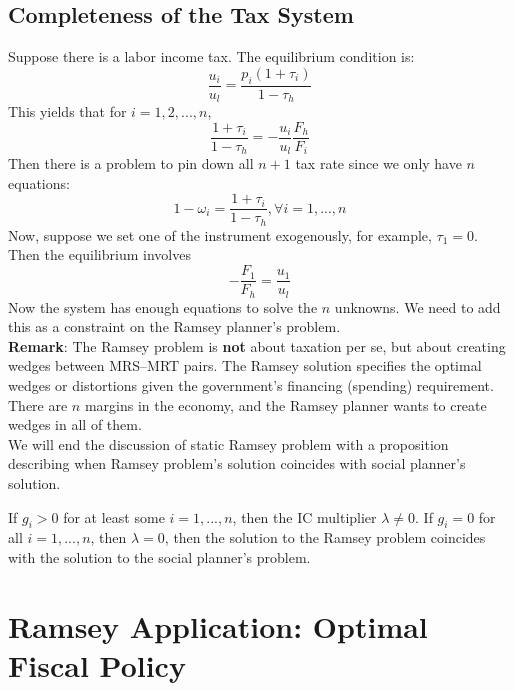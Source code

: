 \documentclass[12pt]{article}
\begin{document}
	\subsection{Completeness of the Tax System}
	Suppose there is a labor income tax. The equilibrium condition is:
	\begin{equation*}
		\frac{u_i}{u_l} = \frac{p_i (1 + \tau_i)}{1-\tau_h}
	\end{equation*}
	This yields that for $i = 1, 2, ..., n$,
	\begin{equation*}
		\frac{1 + \tau_i}{1-\tau_h} = -\frac{u_i}{u_l}\frac{F_h}{F_i}
	\end{equation*}
	Then there is a problem to pin down all $n+1$ tax rate since we only have $n$ equations:
	\begin{equation*}
		1 - \omega _i = \frac{1 + \tau_i}{1-\tau_h}, \forall i = 1, ..., n
	\end{equation*}
	Now, suppose we set one of the instrument exogenously, for example, $\tau_1 = 0$. Then the equilibrium involves
	\begin{equation*}
		-\frac{F_1}{F_h} = \frac{u_1}{u_l}
	\end{equation*}
	Now the system has enough equations to solve the $n$ unknowns. We need to add this as a constraint on the Ramsey planner's problem.\\
	
	\noindent
		\textbf{Remark}: The Ramsey problem is \textbf{not} about taxation per se, but about creating wedges between MRS--MRT pairs. The Ramsey solution specifies the optimal wedges or distortions given the government's financing (spending) requirement. There are $n$ margins in the economy, and the Ramsey planner wants to create wedges in all of them.\\
	We will end the discussion of static Ramsey problem with a proposition describing when Ramsey problem's solution coincides with social planner's solution.
	
	\begin{proposition}
		If $g_i >0$ for at least some $i = 1, ..., n$, then the IC multiplier $\lambda \neq 0$. If $g_i=0$ for all $i = 1, ..., n$, then $\lambda = 0$, then the solution to the Ramsey problem coincides with the solution to the social planner's problem.
	\end{proposition}
	
	\section{Ramsey Application: Optimal Fiscal Policy}
\end{document}
